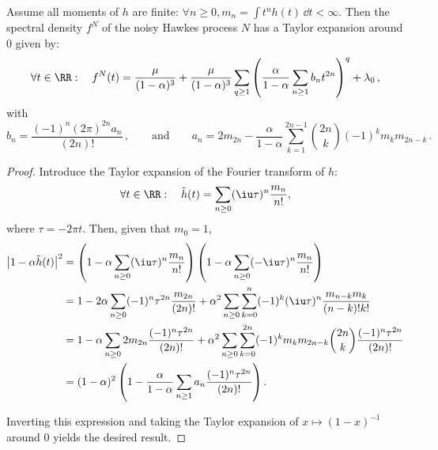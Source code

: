 \begin{subappendices}
\begin{lemma}\label{lemma:taylor}
Assume all moments of $h$ are finite: $\forall n \ge 0, m_n = \int t^n h(t) \, \dd t < \infty$.
Then
the spectral density $f^N$ of the noisy Hawkes process $N$ has a Taylor expansion around $0$ given by:
\begin{equation}\label{eq:chap3_taylor}
\forall t \in \RR: \quad
  f^N(t) = \frac{\mu}{(1-\alpha)^3} + \frac{\mu}{(1-\alpha)^3} \sum_{q \ge 1} \left( \frac{\alpha}{1 - \alpha} \sum_{n \ge 1} b_n t^{2n} \right)^q + \lambda_0 \,,
\end{equation}
with 
\begin{equation}\label{eq:chap3_taylor_an_bn}
  b_n = \frac{(-1)^n (2\pi)^{2n} a_n}{(2n)!} \,, \qquad \text{and} \qquad
  a_n = 2 m_{2n} - \frac{\alpha}{1 - \alpha} \sum_{k=1}^{2n-1} \binom{2n}{k} (-1)^k m_k m_{2n-k} \,.
\end{equation}
\end{lemma}
\begin{proof}
Introduce the Taylor expansion of the Fourier transform of $h$:
\begin{equation*}
\forall t \in \RR: \quad
  \tilde h(t) = \sum_{n \ge 0} (\iu \tau)^n \frac{m_n}{n!},
\end{equation*}
where $\tau = -2 \pi t$.
Then, given that $m_0=1$,
\begin{align*}
  \left \lvert 1 - \alpha \tilde h(t) \right \rvert^2 
  &= \left( 1 - \alpha \sum_{n \ge 0} (\iu \tau)^n \frac{m_n}{n!} \right) \left( 1 - \alpha \sum_{n \ge 0} (-\iu \tau)^n \frac{m_n}{n!} \right)\\
  &= 1 - 2 \alpha \sum_{n \ge 0} (-1)^n \tau^{2n} \frac{m_{2n}}{(2n)!} + \alpha^2 \sum_{n \ge 0} \sum_{k=0}^n (-1)^k (\iu \tau)^n \frac{m_{n-k}m_k}{(n-k)!k!}\\
  &= 1 - \alpha \sum_{n \ge 0} 2 m_{2n} \frac{(-1)^n \tau^{2n}}{(2n)!} + \alpha^2 \sum_{n \ge 0} \sum_{k=0}^{2n} (-1)^k m_k m_{2n-k} \binom{2n}{k} \frac{(-1)^n \tau^{2n}}{(2n)!}\\
  &= (1 - \alpha)^2 \left( 1 - \frac{\alpha}{1 - \alpha} \sum_{n \ge 1} a_n \frac{(-1)^n \tau^{2n}}{(2n)!} \right).
\end{align*}

Inverting this expression and taking the Taylor expansion of $x \mapsto (1 - x)^{-1}$ around 0 yields the desired result.
\end{proof}


\end{subappendices}

